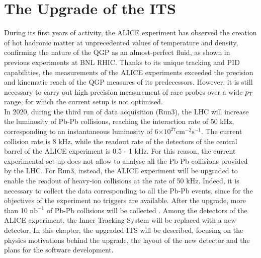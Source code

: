 \chapter{The Upgrade of the ITS}
During its first years of activity, the ALICE experiment has observed the creation of hot hadronic matter at unprecedented values of temperature and density, confirming the nature of the QGP as an almost-perfect fluid, as shown in previous experiments at BNL RHIC. Thanks to its unique tracking and PID capabilities, the measurements of the ALICE experiments exceeded the precision and kinematic reach of the QGP measures of its predecessors. However, it is still necessary to carry out high precision measurement of rare probes over a wide $p_\text{T}$ range, for which the current setup is not optimised.\\
In 2020, during the third run of data acquisition (Run3), the LHC will increase the luminosity of Pb-Pb collisions, reaching the interaction rate of 50 kHz, corresponding to an instantaneous luminosity of 6$\mathrm{\times 10^{27} cm^{-2}s^{-1}}$. The current collision rate is 8 kHz, while the readout rate of the detectors of the central barrel of the ALICE experiment is  0.5 - 1 kHz. For this reason, the current experimental set up does not allow to analyse all the Pb-Pb collisions provided by the LHC. For Run3, instead, the ALICE experiment will be upgraded to enable the readout of heavy-ion collisions at the rate of 50 kHz. Indeed, it is necessary to collect the data corresponding to all the Pb-Pb events, since for the objectives of the experiment no triggers are available. After the upgrade, more than 10 $\mathrm{nb^{-1}}$ of Pb-Pb collisions will be collected \cite{uptdr}. Among the detectors of the ALICE experiment, the Inner Tracking System will be replaced with a new detector. In this chapter, the upgraded ITS will be described, focusing on the physics motivations behind the upgrade, the layout of the new detector and the plans for the software development.
